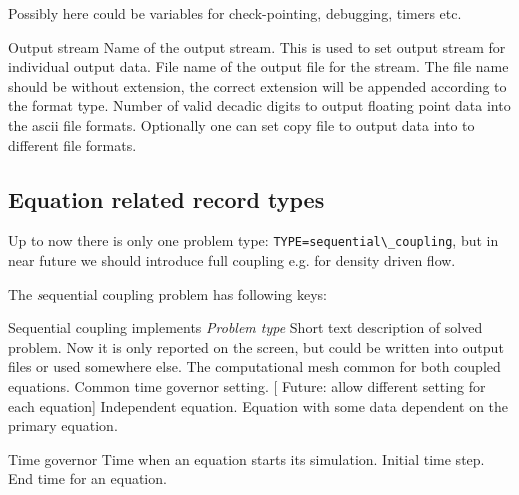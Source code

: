 Possibly here could be variables for check-pointing, debugging, timers etc.

\begin{recordtype}{Output stream}{}
  Name of the output stream. This is used to set output stream for 
  individual output data. 
  File name of the output file for the stream. The file name should be without extension, the correct extension
  will be appended according to the format type.
 Number of valid decadic digits to output floating point data into the ascii file formats.
 Optionally one can set copy file to output data into to different file formats.
\end{recordtype}


\subsection{Equation related record types}
Up to now there is only one problem type: \verb'TYPE=sequential\_coupling', 
but in near future we should introduce full coupling e.g. for density driven flow.

The {\emph sequential coupling problem} has following keys:
\begin{recordtype}{Sequential coupling}{ implements {\it Problem type} }
Short text description of solved problem. Now it is only reported on the screen, but could be 
written into output files or used somewhere else.
%
The computational mesh common for both coupled equations.
%
Common time governor  setting.
[ Future: allow different setting for each equation]
%
Independent equation.
%
Equation with some data dependent on the primary equation.
\end{recordtype}

\begin{recordtype}{Time governor}{}
Time when an equation starts its simulation.
Initial time step.
End time for an equation. 
\end{recordtype}

